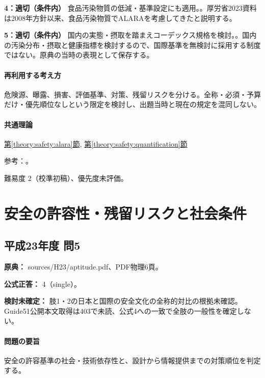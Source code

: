 \noindent\textbf{4：適切（条件内）} 食品汚染物質の低減・基準設定にも適用。。厚労省2023資料は2008年方針以来、食品汚染物質でALARAを考慮してきたと説明する。\par

\noindent\textbf{5：適切（条件内）} 国内の実態・摂取を踏まえコーデックス規格を検討。。国内の汚染分布・摂取と健康指標を検討するので、国際基準を無検討に採用する制度ではない。原典の当時の表現として保存する。\par

\paragraph{再利用する考え方} 危険源、曝露、損害、評価基準、対策、残留リスクを分ける。全称・必須・予算だけ・優先順位なしという限定を検討し、出題当時と現在の規定を混同しない。

\paragraph{共通理論} \hyperref[theory:safety:alara]{第\ref*{theory:safety:alara}節}, \hyperref[theory:safety:quantification]{第\ref*{theory:safety:quantification}節}

\par 参考：\cite{saf_icrp103,saf_icrpaedia,saf_food2023}。

\par 難易度 2（校準初稿）、優先度未評価。

\section{安全の許容性・残留リスクと社会条件}

\subsection{平成23年度 問5}
\label{q:h23-reg-apt-05}

\noindent\textbf{原典：} sources/H23/aptitude.pdf、PDF物理6頁。

\textbf{公式正答：} 4（single）。

\par\textbf{検討未確定：} 肢1・2の日本と国際の安全文化の全称的対比の根拠未確認。Guide51公開本文取得は403で未読、公式4への一致で全肢の一般性を確定しない。

\paragraph{問題の要旨} 安全の許容基準の社会・技術依存性と、設計から情報提供までの対策順位を判定する。

